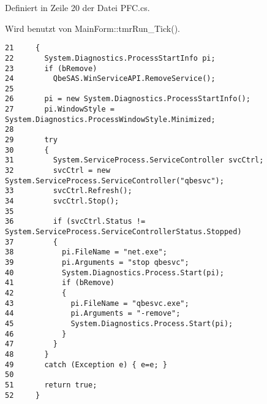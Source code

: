 Definiert in Zeile 20 der Datei PFC.cs.

Wird benutzt von Main\-Form::tmr\-Run\_\-Tick().



\footnotesize\begin{verbatim}21     {
22       System.Diagnostics.ProcessStartInfo pi;
23       if (bRemove)
24         QbeSAS.WinServiceAPI.RemoveService();
25 
26       pi = new System.Diagnostics.ProcessStartInfo();
27       pi.WindowStyle = System.Diagnostics.ProcessWindowStyle.Minimized;
28 
29       try 
30       {
31         System.ServiceProcess.ServiceController svcCtrl;
32         svcCtrl = new System.ServiceProcess.ServiceController("qbesvc");
33         svcCtrl.Refresh();
34         svcCtrl.Stop();
35 
36         if (svcCtrl.Status != System.ServiceProcess.ServiceControllerStatus.Stopped)
37         {
38           pi.FileName = "net.exe";
39           pi.Arguments = "stop qbesvc";
40           System.Diagnostics.Process.Start(pi);
41           if (bRemove)
42           {
43             pi.FileName = "qbesvc.exe";
44             pi.Arguments = "-remove";
45             System.Diagnostics.Process.Start(pi);
46           }
47         }
48       } 
49       catch (Exception e) { e=e; }
50 
51       return true;
52     }
\end{verbatim}\normalsize 
